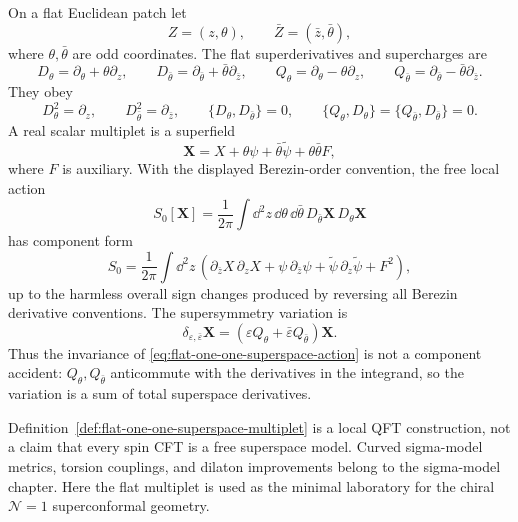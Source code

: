 \begin{definition}
\label{def:flat-one-one-superspace-multiplet}
On a flat Euclidean patch let
\[
  Z=(z,\theta),\qquad \bar Z=(\bar z,\bar\theta),
\]
where \(\theta,\bar\theta\) are odd coordinates.  The flat superderivatives
and supercharges are
\begin{equation}
  D_\theta=\partial_\theta+\theta\partial_z,
  \qquad
  D_{\bar\theta}=\partial_{\bar\theta}+\bar\theta\partial_{\bar z},
  \qquad
  Q_\theta=\partial_\theta-\theta\partial_z,
  \qquad
  Q_{\bar\theta}=\partial_{\bar\theta}-\bar\theta\partial_{\bar z}.
  \label{eq:flat-one-one-superderivatives}
\end{equation}
They obey
\[
  D_\theta^2=\partial_z,\qquad
  D_{\bar\theta}^2=\partial_{\bar z},\qquad
  \{D_\theta,D_{\bar\theta}\}=0,
  \qquad
  \{Q_\theta,D_\theta\}=\{Q_{\bar\theta},D_{\bar\theta}\}=0.
\]
A real scalar multiplet is a superfield
\begin{equation}
  \mathbf X
  =
  X+\theta\psi+\bar\theta\widetilde\psi+\theta\bar\theta F ,
  \label{eq:flat-one-one-real-superfield}
\end{equation}
where \(F\) is auxiliary.  With the displayed Berezin-order convention, the
free local action
\begin{equation}
  S_0[\mathbf X]
  =
  \frac{1}{2\pi}\int \dd^2z\,\dd\theta\,\dd\bar\theta\,
  D_{\bar\theta}\mathbf X\,D_\theta\mathbf X
  \label{eq:flat-one-one-superspace-action}
\end{equation}
has component form
\begin{equation}
  S_0
  =
  \frac{1}{2\pi}\int \dd^2z\,
  \left(
    \partial_{\bar z}X\,\partial_zX
    +\psi\,\partial_{\bar z}\psi
    +\widetilde\psi\,\partial_z\widetilde\psi
    +F^2
  \right),
  \label{eq:flat-one-one-component-action}
\end{equation}
up to the harmless overall sign changes produced by reversing all Berezin
derivative conventions.  The supersymmetry variation is
\[
  \delta_{\varepsilon,\bar\varepsilon}\mathbf X
  =
  (\varepsilon Q_\theta+\bar\varepsilon Q_{\bar\theta})\mathbf X .
\]
Thus the invariance of \eqref{eq:flat-one-one-superspace-action} is not a
component accident: \(Q_\theta,Q_{\bar\theta}\) anticommute with the
derivatives in the integrand, so the variation is a sum of total superspace
derivatives.
\end{definition}

Definition~\ref{def:flat-one-one-superspace-multiplet} is a local QFT
construction, not a claim that every spin CFT is a free superspace model.
Curved sigma-model metrics, torsion couplings, and dilaton improvements
belong to the sigma-model chapter.  Here the flat multiplet is used as the
minimal laboratory for the chiral \(\mathcal N=1\) superconformal geometry.

